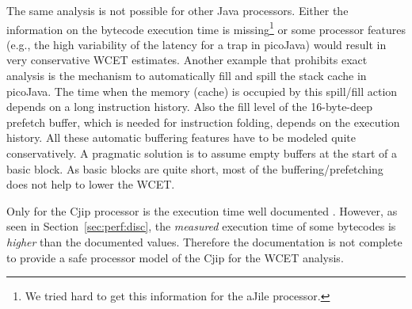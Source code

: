 The same analysis is not possible for other Java processors. Either
the information on the bytecode execution time is missing\footnote{We
tried hard to get this information for the aJile processor.} or some
processor features (e.g., the high variability of the latency for a
trap in picoJava) would result in very conservative WCET estimates.
Another example that prohibits exact analysis is the mechanism to
automatically fill and spill the stack cache in picoJava. The time
when the memory (cache) is occupied by this spill/fill action depends
on a long instruction history. Also the fill level of the
16-byte-deep prefetch buffer, which is needed for instruction
folding, depends on the execution history. All these automatic
buffering features have to be modeled quite conservatively. A
pragmatic solution is to assume empty buffers at the start of a basic
block. As basic blocks are quite short, most of the
buffering/prefetching does not help to lower the WCET.

Only for the Cjip processor is the execution time well documented
\cite{CjipRef}. However, as seen in Section~\ref{sec:perf:disc}, the
\emph{measured} execution time of some bytecodes is \emph{higher}
than the documented values. Therefore the documentation is not
complete to provide a safe processor model of the Cjip for the WCET
analysis.
